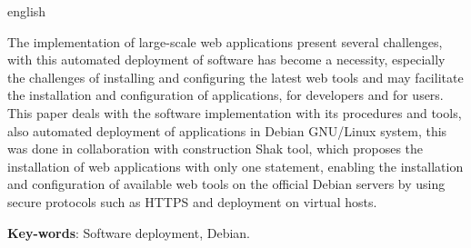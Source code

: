 \begin{resumo}[Abstract]
 \begin{otherlanguage*}{english}

The implementation of large-scale web applications present several challenges, with
this automated deployment of software has become a necessity, especially the
challenges of installing and configuring the latest web tools and may facilitate
the installation and configuration of applications, for developers and for users.
This paper deals with the software implementation with its procedures and tools,
also automated deployment of applications in Debian GNU/Linux system, this was
done in collaboration with construction Shak tool, which proposes the installation
of web applications with only one statement, enabling the installation and
configuration of available web tools on the official Debian servers by using
secure protocols such as HTTPS and deployment on virtual hosts.
   \vspace{\onelineskip}

   \noindent
   \textbf{Key-words}: Software deployment, Debian.
 \end{otherlanguage*}
\end{resumo}
